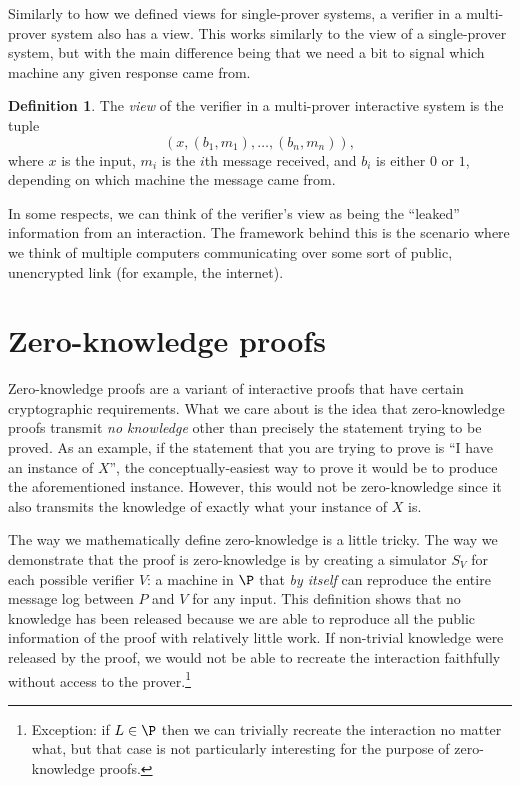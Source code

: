 \documentclass[english,12pt]{reedthesis}
\theoremstyle{plain}
\theoremstyle{definition}
\newtheorem{defn}[defn]{Definition}
\theoremstyle{remark}
\begin{document}
Similarly to how we defined views for single-prover systems, a verifier in a
multi-prover system also has a view. This works similarly to the view of a
single-prover system, but with the main difference being that we need a bit to
signal which machine any given response came from.

\begin{defn}\label{def:view-mip}
  The \emph{view} of the verifier in a multi-prover interactive system is the
  tuple
  \[
    (x, (b_{1}, m_{1}), \ldots, (b_{n}, m_{n})),
  \]
  where $x$ is the input, $m_{i}$ is the $i$th message received, and $b_{i}$ is
  either $0$ or $1$, depending on which machine the message came from.
\end{defn}

In some respects, we can think of the verifier's view as being the ``leaked''
information from an interaction. The framework behind this is the scenario
where we think of multiple computers communicating over some sort of public,
unencrypted link (for example, the internet).

\section{Zero-knowledge proofs}\label{sec:zero-knowledge}

Zero-knowledge proofs are a variant of interactive proofs that have certain
cryptographic requirements. What we care about is the idea that zero-knowledge
proofs transmit \emph{no knowledge} other than precisely the statement trying to
be proved. As an example, if the statement that you are trying to prove is ``I
have an instance of $X$'', the conceptually-easiest way to prove it would be to
produce the aforementioned instance. However, this would not be zero-knowledge
since it also transmits the knowledge of exactly what your instance of $X$ is.

The way we mathematically define zero-knowledge is a little tricky. The way we
demonstrate that the proof is zero-knowledge is by creating a simulator $S_{V}$
for each possible verifier $V$: a machine in $\P$ that \emph{by itself} can
reproduce the entire message log between $P$ and $V$ for any input. This
definition shows that no knowledge has been released because we are able to
reproduce all the public information of the proof with relatively little work.
If non-trivial knowledge were released by the proof, we would not be able to
recreate the interaction faithfully without access to the
prover.\footnote{Exception: if $L \in \P$ then we can trivially recreate the
  interaction no matter what, but that case is not particularly interesting for
  the purpose of zero-knowledge proofs.}
\end{document}
